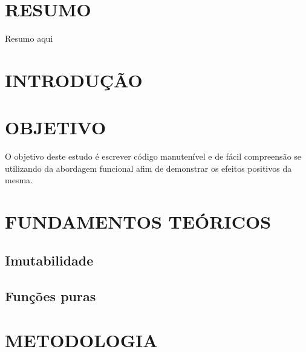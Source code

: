 \documentclass[date,twocolumn,a4paper]{ppgem}
\begin{document}
\thispagestyle{plain}
\makeheader




\section*{RESUMO}
Resumo aqui

\section{INTRODUÇÃO}


\section{OBJETIVO}
O objetivo deste estudo é escrever código manutenível e de fácil compreensão se utilizando da abordagem funcional
afim de demonstrar os efeitos positivos da mesma.

\section{FUNDAMENTOS TEÓRICOS}
\subsection{Imutabilidade}
\subsection{Funções puras}

\section{METODOLOGIA}
\end{document}

